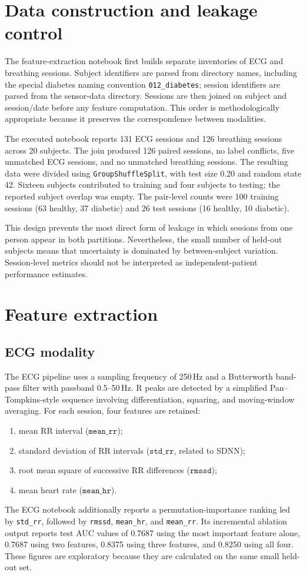 \documentclass[11pt,a4paper]{article}
\begin{document}
\section{Data construction and leakage control}
The feature-extraction notebook first builds separate inventories of ECG and breathing sessions. Subject identifiers are parsed from directory names, including the special diabetes naming convention \texttt{012\_diabetes}; session identifiers are parsed from the sensor-data directory. Sessions are then joined on subject and session/date before any feature computation. This order is methodologically appropriate because it preserves the correspondence between modalities.

The executed notebook reports 131 ECG sessions and 126 breathing sessions across 20 subjects. The join produced 126 paired sessions, no label conflicts, five unmatched ECG sessions, and no unmatched breathing sessions. The resulting data were divided using \texttt{GroupShuffleSplit}, with test size 0.20 and random state 42. Sixteen subjects contributed to training and four subjects to testing; the reported subject overlap was empty. The pair-level counts were 100 training sessions (63 healthy, 37 diabetic) and 26 test sessions (16 healthy, 10 diabetic).

This design prevents the most direct form of leakage in which sessions from one person appear in both partitions. Nevertheless, the small number of held-out subjects means that uncertainty is dominated by between-subject variation. Session-level metrics should not be interpreted as independent-patient performance estimates.

\section{Feature extraction}
\subsection{ECG modality}
The ECG pipeline uses a sampling frequency of 250\,Hz and a Butterworth band-pass filter with passband 0.5--50\,Hz. R peaks are detected by a simplified Pan--Tompkins-style sequence involving differentiation, squaring, and moving-window averaging. For each session, four features are retained:
\begin{enumerate}
  \item mean RR interval ($\texttt{mean\_rr}$);
  \item standard deviation of RR intervals ($\texttt{std\_rr}$, related to SDNN);
  \item root mean square of successive RR differences ($\texttt{rmssd}$);
  \item mean heart rate ($\texttt{mean\_hr}$).
\end{enumerate}
The ECG notebook additionally reports a permutation-importance ranking led by \texttt{std\_rr}, followed by \texttt{rmssd}, \texttt{mean\_hr}, and \texttt{mean\_rr}. Its incremental ablation output reports test AUC values of 0.7687 using the most important feature alone, 0.7687 using two features, 0.8375 using three features, and 0.8250 using all four. These figures are exploratory because they are calculated on the same small held-out set.
\end{document}
